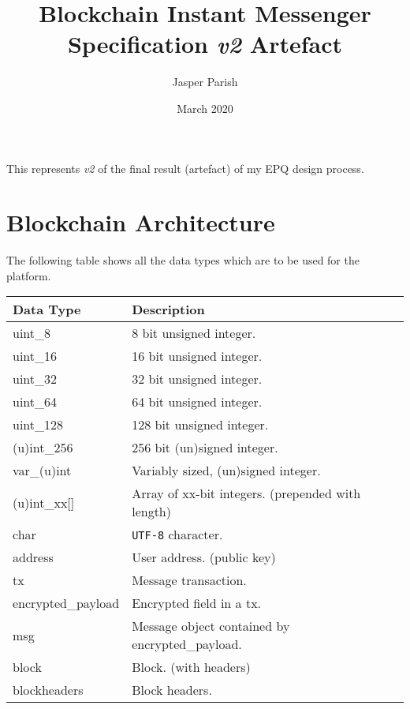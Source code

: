 \documentclass{article}
\title{Blockchain Instant Messenger Specification \textit{v2} Artefact}
\author{Jasper Parish}
\date{March 2020}
\begin{document}
\maketitle
\begin{center}
   This represents \textit{v2} of the final result (artefact) of my EPQ design process.
\end{center}

\newpage
\tableofcontents
\newpage


\section{Blockchain Architecture}
The following table shows all the data types which are to be used for the platform.
\begin{table}[h]
\centering
\begin{tabular}{|l|p{8.5cm}|}
\hline
\rowcolor{tblgrey} 
Data Type  & Description                \\ \hline
uint\_8     & 8 bit unsigned integer.            \\ \hline
uint\_16    & 16 bit unsigned integer.           \\ \hline
uint\_32    & 32 bit unsigned integer.           \\ \hline
uint\_64    & 64 bit unsigned integer.           \\ \hline
uint\_128   & 128 bit unsigned integer.          \\ \hline
(u)int\_256 & 256 bit (un)signed integer.          \\ \hline
var\_(u)int & Variably sized, (un)signed integer.    \\ \hline
(u)int\_xx[\hspace{0.05cm}] & Array of xx-bit integers. (prepended with length) \\ \hline
char        & \texttt{UTF-8} character. \\ \hline
address     & User address. (public key) \\ \hline
tx          & Message transaction.      \\ \hline
encrypted\_payload & Encrypted field in a tx. \\ \hline
msg         & Message object contained by encrypted\_payload. \\ \hline
block       & Block. (with headers)     \\ \hline
blockheaders& Block headers.            \\ \hline
\end{tabular}
\end{table}
\end{document}

